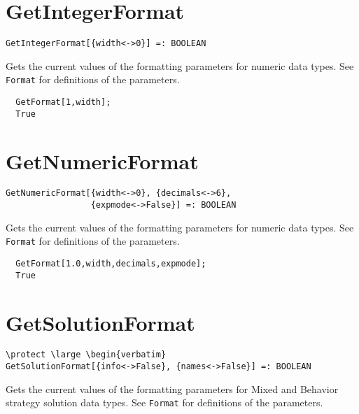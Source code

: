 
\section*{GetIntegerFormat}\label{ExtGetIntegerFormat}
\begin{verbatim}
GetIntegerFormat[{width<->0}] =: BOOLEAN 
\end{verbatim}

\noindent
Gets the current values of the formatting parameters for numeric
data types.  See \verb+Format+ for definitions of the
parameters.

\udfbody 
\begin{verbatim}
  GetFormat[1,width];
  True
\end{verbatim} 


\section*{GetNumericFormat}\label{ExtGetNumericFormat}
\begin{verbatim}
GetNumericFormat[{width<->0}, {decimals<->6}, 
                 {expmode<->False}] =: BOOLEAN 
\end{verbatim}

\noindent
Gets the current values of the formatting parameters for numeric
data types.  See \verb+Format+ for definitions of the
parameters.  

\udfbody
\begin{verbatim}
  GetFormat[1.0,width,decimals,expmode];
  True
\end{verbatim} 


\section*{GetSolutionFormat}\label{ExtGetSolutionFormat}
\begin{verbatim}
\protect \large \begin{verbatim}
GetSolutionFormat[{info<->False}, {names<->False}] =: BOOLEAN 
\end{verbatim}

\noindent
Gets the current values of the formatting parameters for Mixed and
Behavior strategy solution data types.  See \verb+Format+ for
definitions of the parameters.  

